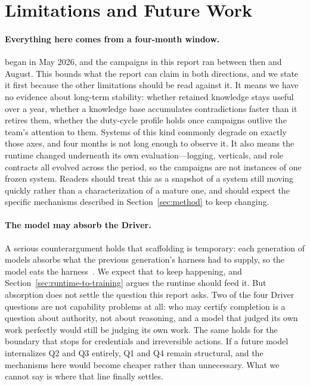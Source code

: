 \section{Limitations and Future Work}
\label{sec:limitations}

\paragraph{Everything here comes from a four-month window.}
\systemname{} began in May 2026, and the campaigns in this report ran between then
and August. This bounds what the report can claim in both directions, and we state it
first because the other limitations should be read against it. It means we have no
evidence about long-term stability: whether retained knowledge stays useful over a year,
whether a knowledge base accumulates contradictions faster than it retires them,
whether the duty-cycle profile holds once campaigns outlive the team's attention to
them. Systems of this kind commonly degrade on exactly those axes, and four months is
not long enough to observe it. It also means the runtime changed underneath its own
evaluation---logging, verticals, and role contracts all evolved across the period, so
the campaigns are not instances of one frozen system. Readers should treat this as a
snapshot of a system still moving quickly rather than a characterization of a mature
one, and should expect the specific mechanisms described in
Section~\ref{sec:method} to keep changing.

\paragraph{The model may absorb the Driver.}
A serious counterargument holds that scaffolding is temporary: each generation of
models absorbs what the previous generation's harness had to supply, so the model
eats the harness~\citep{sequoia2026trainingdata}. We expect that to keep happening,
and Section~\ref{sec:runtime-to-training} argues the runtime should feed it. But
absorption does not settle the question this report asks. Two of the four Driver
questions are not capability problems at all: who may certify completion is a
question about authority, not about reasoning, and a model that judged its own work
perfectly would still be judging its own work. The same holds for the boundary that
stops for credentials and irreversible actions. If a future model internalizes Q2 and
Q3 entirely, Q1 and Q4 remain structural, and the mechanisms here would become
cheaper rather than unnecessary. What we cannot say is where that line finally
settles.

